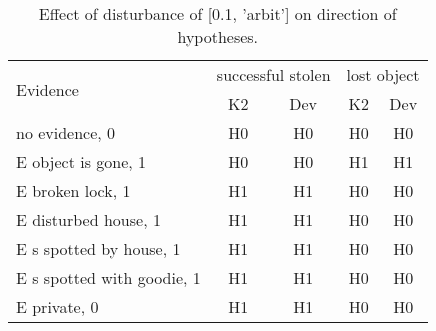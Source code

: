 \begin{table}\begin{tabular}{l|cc|cc}\toprule\multirow{2}{*}{Evidence} & \multicolumn{2}{c}{successful stolen}& \multicolumn{2}{c}{lost object}\\& {K2} & {Dev}& {K2} & {Dev}\\\midrule
no evidence, 0 & H0&H0&H0&H0\\E object is gone, 1 & H0&H0&H1&H1\\E broken lock, 1 & H1&H1&H0&H0\\E disturbed house, 1 & H1&H1&H0&H0\\E s spotted by house, 1 & H1&H1&H0&H0\\E s spotted with goodie, 1 & H1&H1&H0&H0\\E private, 0 & H1&H1&H0&H0\\\bottomrule\end{tabular}\caption{Effect of disturbance of [0.1, 'arbit'] on direction of hypotheses.}\end{table}